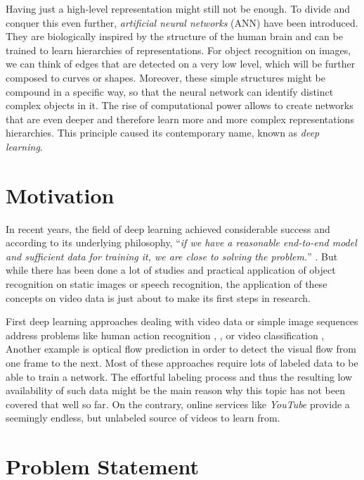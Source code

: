 Having just a high-level representation might still not be enough. To divide and conquer this even further, \textit{artificial neural networks} (ANN) have been introduced. They are biologically inspired by the structure of the human brain \parencite{ann} and can be trained to learn hierarchies of representations. For object recognition on images, we can think of edges that are detected on a very low level, which will be further composed to curves or shapes. Moreover, these simple structures might be compound in a specific way, so that the neural network can identify distinct complex objects in it. The rise of computational power allows to create networks that are even deeper and therefore learn more and more complex representations hierarchies. This principle caused its contemporary name, known as \textit{deep learning}.

\section{Motivation}

In recent years, the field of deep learning achieved considerable success and according to its underlying philosophy, ``\textit{if we have a reasonable end-to-end model and sufficient data for training it, we are close to solving the problem.}'' \parencite{conv_lstm_nowcasting}. But while there has been done a lot of studies and practical application of object recognition on static images or speech recognition, the application of these concepts on video data is just about to make its first steps in research. 

First deep learning approaches dealing with video data or simple image sequences address problems like human action recognition \parencite{conv3d_action_class}, \parencite{two_stream_action}, \parencite{longterm_rec_recog} or video classification \parencite{large_video_class}, Another example is optical flow prediction \parencite{flownet} in order to detect the visual flow from one frame to the next. Most of these approaches require lots of labeled data to be able to train a network. The effortful labeling process and thus the resulting low availability of such data might be the main reason why this topic has not been covered that well so far. On the contrary, online services like \textit{YouTube} provide a seemingly endless, but unlabeled source of videos to learn from.


\section{Problem Statement}

